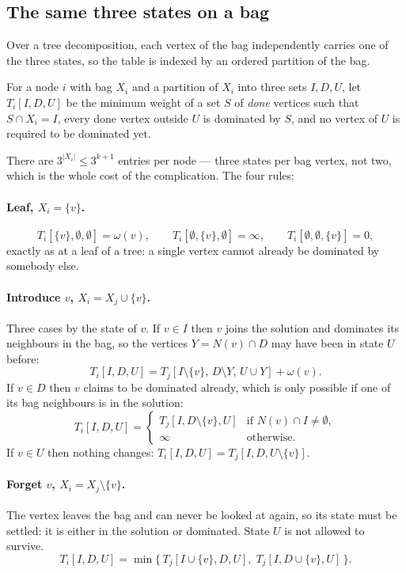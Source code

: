 \subsection{The same three states on a bag}

Over a tree decomposition, each vertex of the bag independently carries one of
the three states, so the table is indexed by an ordered partition of the bag.

\begin{definition}\label{def:tw-ds-table}
For a node $i$ with bag $X_i$ and a partition of $X_i$ into three sets
$I, D, U$, let $T_i[I,D,U]$ be the minimum weight of a set $S$ of \emph{done}
vertices such that $S \cap X_i = I$, every done vertex outside $U$ is dominated
by $S$, and no vertex of $U$ is required to be dominated yet.
\end{definition}

There are $3^{|X_i|} \le 3^{k+1}$ entries per node --- three states per bag
vertex, not two, which is the whole cost of the complication. The four rules:

\paragraph{Leaf, $X_i = \{v\}$.}
\[ T_i[\{v\},\emptyset,\emptyset] = \omega(v), \qquad
   T_i[\emptyset,\{v\},\emptyset] = \infty, \qquad
   T_i[\emptyset,\emptyset,\{v\}] = 0, \]
exactly as at a leaf of a tree: a single vertex cannot already be dominated by
somebody else.

\paragraph{Introduce $v$, $X_i = X_j \cup \{v\}$.} Three cases by the state of
$v$. If $v \in I$ then $v$ joins the solution and dominates its neighbours in
the bag, so the vertices $Y = N(v) \cap D$ may have been in state $U$ before:
\[ T_i[I,D,U] = T_j[I \setminus \{v\},\, D \setminus Y,\, U \cup Y] +
   \omega(v). \]
If $v \in D$ then $v$ claims to be dominated already, which is only possible if
one of its bag neighbours is in the solution:
\[ T_i[I,D,U] = \begin{cases}
     T_j[I, D \setminus \{v\}, U] & \text{if } N(v) \cap I \ne \emptyset, \\
     \infty & \text{otherwise.}
   \end{cases} \]
If $v \in U$ then nothing changes: $T_i[I,D,U] = T_j[I,D,U \setminus \{v\}]$.

\paragraph{Forget $v$, $X_i = X_j \setminus \{v\}$.} The vertex leaves the bag
and can never be looked at again, so its state must be settled: it is either in
the solution or dominated. State $U$ is not allowed to survive.
\[ T_i[I,D,U] = \min\bigl\{\, T_j[I \cup \{v\}, D, U],\;
                            T_j[I, D \cup \{v\}, U] \,\bigr\}. \]

